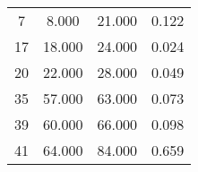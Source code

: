 % 
\begin{tabular}{cccc}
  \hline
  \hline
7 & 8.000 & 21.000 & 0.122 \\ 
  17 & 18.000 & 24.000 & 0.024 \\ 
  20 & 22.000 & 28.000 & 0.049 \\ 
  35 & 57.000 & 63.000 & 0.073 \\ 
  39 & 60.000 & 66.000 & 0.098 \\ 
  41 & 64.000 & 84.000 & 0.659 \\ 
   \hline
\end{tabular}

